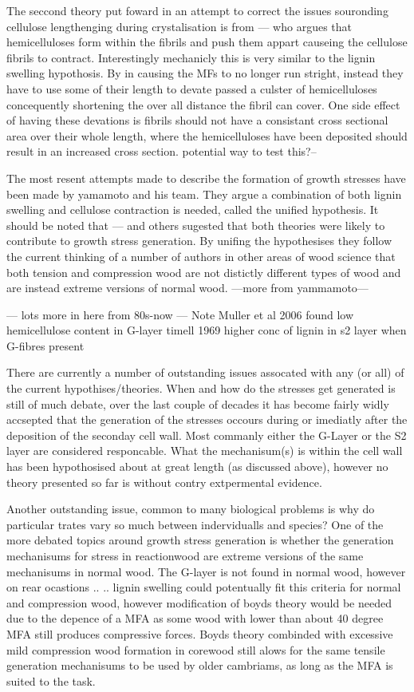 \documentclass{article}
\begin{document}
The seccond theory put foward in an attempt to correct the issues souronding
cellulose lengthenging during crystalisation is from --- who argues that
hemicelluloses form within the fibrils and push them appart causeing the
cellulose fibrils to contract. Interestingly mechanicly this is very similar to
the lignin swelling hypothosis. By in causing the MFs to no longer run stright,
instead they have to use some of their length to devate passed a culster of
hemicelluloses concequently shortening the over all distance the fibril can
cover. One side effect of having these devations is fibrils should not have a
consistant cross sectional area over their whole length, where the
hemicelluloses have been deposited should result in an increased cross section.
potential way to test this?--

The most resent attempts made to describe the formation of growth stresses have
been made by yamamoto and his team. They argue a combination of both lignin
swelling and cellulose contraction is needed, called the unified hypothesis. It
should be noted that --- and others sugested that both theories were likely to
contribute to growth stress generation. By unifing the hypothesises they follow
the current thinking of a number of authors in other areas of wood science that
both tension and compression wood are not distictly different types of wood and
are instead extreme versions of normal wood. ---more from yammamoto---


--- lots more in here from 80s-now ---
Note Muller et al 2006 found low hemicellulose content in G-layer
timell 1969 higher conc of lignin in s2 layer when G-fibres present

There are currently a number of outstanding issues assocated with any (or all)
of the current hypothises/theories. When and how do the stresses get
generated is still of much debate, over the last couple of decades it has become
fairly widly accsepted that the generation of the stresses occours during or
imediatly after the deposition of the seconday cell wall. Most commanly either
the G-Layer or the S2 layer are considered responcable. What the mechanisum(s)
is within the cell wall has been hypothosised about at great length (as
discussed above), however no theory presented so far is without contry
extpermental evidence.

Another outstanding issue, common to many biological problems is why do
particular trates vary so much between indervidualls and species? One of the
more debated topics around growth stress generation is whether the generation
mechanisums for stress in reactionwood are extreme versions of the same
mechanisums in normal wood. The G-layer is not found in normal wood, however on
rear ocastions .. .. lignin swelling could potentually fit this criteria for
normal and compression wood, however modification of boyds theory would be
needed due to the depence of a MFA as some wood with lower than about 40 degree
MFA still produces compressive forces. Boyds theory combinded with excessive
mild compression wood formation in corewood still alows for the same tensile
generation mechanisums to be used by older cambriams, as long as the MFA is
suited to the task.
\end{document}
